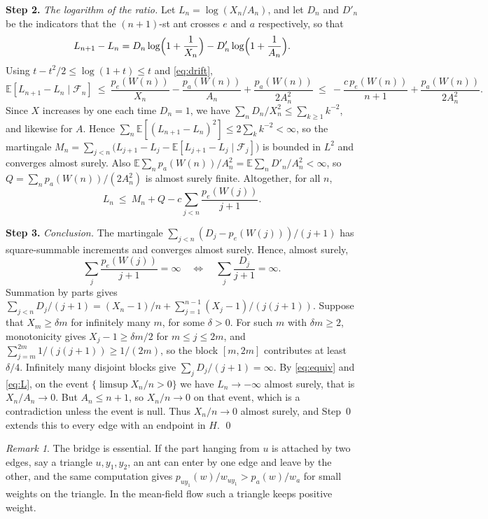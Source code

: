 \documentclass[11pt]{amsart}
\theoremstyle{remark}
\newtheorem{remark}[theorem]{Remark}
\newcommand{\EE}{\mathbb{E}}
\newcommand{\cF}{\mathcal{F}}
\begin{document}
\medskip\noindent\textbf{Step 2.} \emph{The logarithm of the ratio.} Let $L_n=\log(X_n/A_n)$, and let $D_n$ and
$D'_n$ be the indicators that the $(n+1)$-st ant crosses $e$ and $a$ respectively, so that
\[
L_{n+1}-L_n=D_n\log\Bigl(1+\frac1{X_n}\Bigr)-D'_n\log\Bigl(1+\frac1{A_n}\Bigr).
\]
Using $t-t^2/2\le\log(1+t)\le t$ and \eqref{eq:drift},
\[
\EE[L_{n+1}-L_n\mid\cF_n]\ \le\ \frac{p_e(W(n))}{X_n}-\frac{p_a(W(n))}{A_n}+\frac{p_a(W(n))}{2A_n^2}
\ \le\ -\frac{c\,p_e(W(n))}{n+1}+\frac{p_a(W(n))}{2A_n^2}.
\]
Since $X$ increases by one each time $D_n=1$, we have $\sum_nD_n/X_n^2\le\sum_{k\ge1}k^{-2}$, and likewise for $A$.
Hence $\sum_n\EE[(L_{n+1}-L_n)^2]\le2\sum_kk^{-2}<\infty$, so the martingale
$M_n=\sum_{j<n}\bigl(L_{j+1}-L_j-\EE[L_{j+1}-L_j\mid\cF_j]\bigr)$ is bounded in $L^2$ and converges almost surely.
Also $\EE\sum_np_a(W(n))/A_n^2=\EE\sum_nD'_n/A_n^2<\infty$, so $Q=\sum_np_a(W(n))/(2A_n^2)$ is almost surely finite.
Altogether, for all $n$,
\begin{equation}\label{eq:L}
L_n\ \le\ M_n+Q-c\sum_{j<n}\frac{p_e(W(j))}{j+1}.
\end{equation}

\medskip\noindent\textbf{Step 3.} \emph{Conclusion.} The martingale $\sum_{j<n}(D_j-p_e(W(j)))/(j+1)$ has
square-summable increments and converges almost surely. Hence, almost surely,
\begin{equation}\label{eq:equiv}
\sum_j\frac{p_e(W(j))}{j+1}=\infty\quad\Longleftrightarrow\quad\sum_j\frac{D_j}{j+1}=\infty .
\end{equation}
Summation by parts gives $\sum_{j<n}D_j/(j+1)=(X_n-1)/n+\sum_{j=1}^{n-1}(X_j-1)/(j(j+1))$. Suppose that
$X_m\ge\delta m$ for infinitely many $m$, for some $\delta>0$. For such $m$ with $\delta m\ge2$, monotonicity gives
$X_j-1\ge\delta m/2$ for $m\le j\le2m$, and $\sum_{j=m}^{2m}1/(j(j+1))\ge1/(2m)$, so the block $[m,2m]$ contributes at
least $\delta/4$. Infinitely many disjoint blocks give $\sum_jD_j/(j+1)=\infty$. By \eqref{eq:equiv} and \eqref{eq:L},
on the event $\{\limsup X_n/n>0\}$ we have $L_n\to-\infty$ almost surely, that is $X_n/A_n\to0$. But $A_n\le n+1$, so
$X_n/n\to0$ on that event, which is a contradiction unless the event is null. Thus $X_n/n\to0$ almost surely, and
Step~0 extends this to every edge with an endpoint in $H$. \qed

\begin{remark}
The bridge is essential. If the part hanging from $u$ is attached by two edges, say a triangle $u,y_1,y_2$, an ant
can enter by one edge and leave by the other, and the same computation gives $p_{uy_1}(w)/w_{uy_1}>p_a(w)/w_a$ for
small weights on the triangle. In the mean-field flow such a triangle keeps positive weight.
\end{remark}
\end{document}
